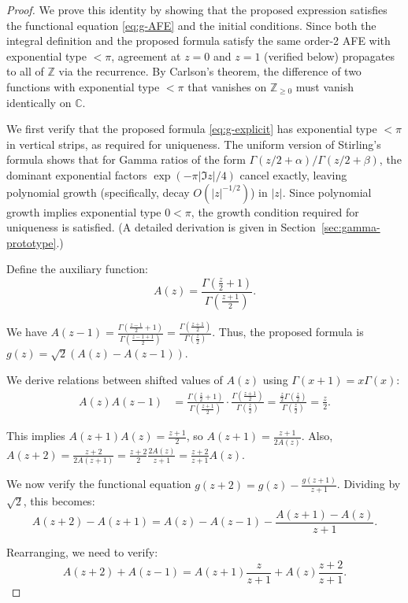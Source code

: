 \documentclass[11pt,reqno]{amsart}
\theoremstyle{definition}
\newcommand{\N}{\mathbb{Z}_{\ge 0}}
\newcommand{\Z}{\mathbb{Z}}
\newcommand{\C}{\mathbb{C}}
\numberwithin{equation}{section}
\begin{document}
\begin{proof}
We prove this identity by showing that the proposed expression satisfies the functional equation \eqref{eq:g-AFE} and the initial conditions. Since both the integral definition and the proposed formula satisfy the same order-2 AFE with exponential type $<\pi$, agreement at $z=0$ and $z=1$ (verified below) propagates to all of $\Z$ via the recurrence. By Carlson's theorem, the difference of two functions with exponential type $<\pi$ that vanishes on $\N$ must vanish identically on $\C$.

We first verify that the proposed formula \eqref{eq:g-explicit} has exponential type $<\pi$ in vertical strips, as required for uniqueness. The uniform version of Stirling's formula shows that for Gamma ratios of the form $\Gamma(z/2+\alpha)/\Gamma(z/2+\beta)$, the dominant exponential factors $\exp(-\pi|\Im z|/4)$ cancel exactly, leaving polynomial growth (specifically, decay $O(|z|^{-1/2})$) in $|z|$. Since polynomial growth implies exponential type $0 < \pi$, the growth condition required for uniqueness is satisfied. (A detailed derivation is given in Section~\ref{sec:gamma-prototype}.)

Define the auxiliary function:
$$A(z) = \frac{\Gamma\left(\frac{z}{2}+1\right)}{\Gamma\left(\frac{z+1}{2}\right)}.$$

We have $A(z-1) = \frac{\Gamma\left(\frac{z-1}{2}+1\right)}{\Gamma\left(\frac{z-1+1}{2}\right)} = \frac{\Gamma\left(\frac{z+1}{2}\right)}{\Gamma\left(\frac{z}{2}\right)}$.
Thus, the proposed formula is $g(z) = \sqrt{2}(A(z) - A(z-1))$.

We derive relations between shifted values of $A(z)$ using $\Gamma(x+1)=x\Gamma(x)$:
\begin{align*}
A(z)A(z-1) &= \frac{\Gamma\left(\frac{z}{2}+1\right)}{\Gamma\left(\frac{z+1}{2}\right)} \cdot \frac{\Gamma\left(\frac{z+1}{2}\right)}{\Gamma\left(\frac{z}{2}\right)} = \frac{\frac{z}{2}\Gamma\left(\frac{z}{2}\right)}{\Gamma\left(\frac{z}{2}\right)} = \frac{z}{2}.
\end{align*}

This implies $A(z+1)A(z) = \frac{z+1}{2}$, so $A(z+1) = \frac{z+1}{2A(z)}$.
Also, $A(z+2) = \frac{z+2}{2A(z+1)} = \frac{z+2}{2} \frac{2A(z)}{z+1} = \frac{z+2}{z+1}A(z)$.

We now verify the functional equation $g(z+2) = g(z) - \frac{g(z+1)}{z+1}$. Dividing by $\sqrt{2}$, this becomes:
$$A(z+2)-A(z+1) = A(z)-A(z-1) - \frac{A(z+1)-A(z)}{z+1}.$$

Rearranging, we need to verify:
$$A(z+2)+A(z-1) = A(z+1)\frac{z}{z+1} + A(z)\frac{z+2}{z+1}.$$


\end{proof}
\end{document}
